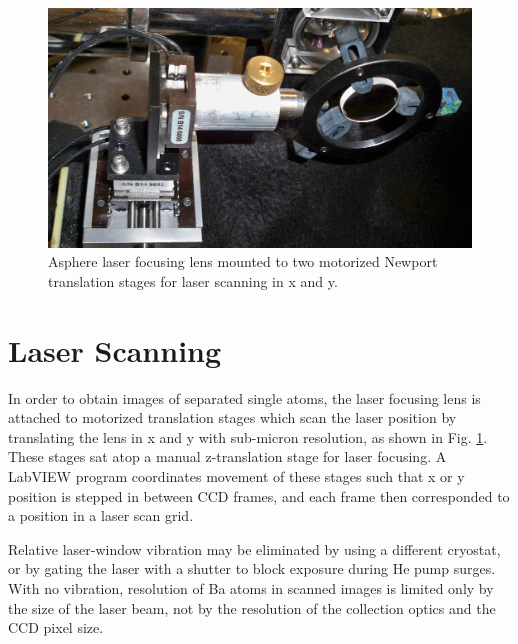 
\begin{figure} %
        \centering
                \includegraphics[width=.5\textwidth]{figures/stages_2.JPG}
                \caption{Asphere laser focusing lens mounted to two motorized Newport translation stages for laser scanning in x and y.}
\label{fig:laserStages}
\end{figure}


\section{Laser Scanning}
\label{sec:laserscanning}

In order to obtain images of separated single atoms, the laser focusing lens is attached to motorized translation stages which scan the laser position by translating the lens in x and y with sub-micron resolution, as shown in Fig. \ref{fig:laserStages}.  These stages sat atop a manual z-translation stage for laser focusing.  A LabVIEW program coordinates movement of these stages such that x or y position is stepped in between CCD frames, and each frame then corresponded to a position in a laser scan grid.

Relative laser-window vibration may be eliminated by using a different cryostat, or by gating the laser with a shutter to block exposure during He pump surges.  With no vibration, resolution of Ba atoms in scanned images is limited only by the size of the laser beam, not by the resolution of the collection optics and the CCD pixel size.


